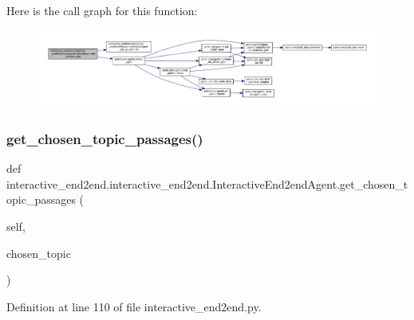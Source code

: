 Here is the call graph for this function\+:
\nopagebreak
\begin{figure}[H]
\begin{center}
\leavevmode
\includegraphics[width=350pt]{classinteractive__end2end_1_1interactive__end2end_1_1InteractiveEnd2endAgent_ad6712805a88e2999f531f764022f2de4_cgraph}
\end{center}
\end{figure}
\mbox{\label{classinteractive__end2end_1_1interactive__end2end_1_1InteractiveEnd2endAgent_ad8ef18518675b9aa72280547b56d3a1e}} 
\subsubsection{\texorpdfstring{get\+\_\+chosen\+\_\+topic\+\_\+passages()}{get\_chosen\_topic\_passages()}}
{\footnotesize\ttfamily def interactive\+\_\+end2end.\+interactive\+\_\+end2end.\+Interactive\+End2end\+Agent.\+get\+\_\+chosen\+\_\+topic\+\_\+passages (\begin{DoxyParamCaption}\item[{}]{self,  }\item[{}]{chosen\+\_\+topic }\end{DoxyParamCaption})}



Definition at line 110 of file interactive\+\_\+end2end.\+py.



